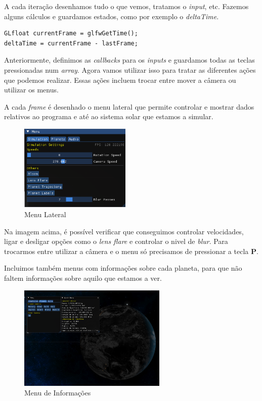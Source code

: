\noindent
A cada iteração desenhamos tudo o que vemos, tratamos o \textit{input}, etc. Fazemos alguns cálculos e guardamos estados, como por exemplo o \textit{deltaTime}.

\begin{lstlisting}[style=Cpp, caption=\textit{DeltaTime}]
GLfloat currentFrame = glfwGetTime();
deltaTime = currentFrame - lastFrame;
\end{lstlisting}

\noindent
Anteriormente, definimos as \textit{callbacks} para os \textit{inputs} e guardamos todas as teclas pressionadas num \textit{array}. Agora vamos utilizar isso para tratar as diferentes ações que podemos realizar.
Essas ações incluem trocar entre mover a câmera ou utilizar os menus.

\noindent
A cada \textit{frame} é desenhado o menu lateral que permite controlar e mostrar dados relativos ao programa e até ao sistema solar que estamos a simular.

\begin{figure}[h]
\centering
\includegraphics[width=150pt]{menu.png}
\caption{Menu Lateral}
\end{figure}

\noindent
Na imagem acima, é possível verificar que conseguimos controlar velocidades, ligar e desligar opções como o \textit{lens flare} e controlar o nivel de \textit{blur}.
Para trocarmos entre utilizar a câmera e o menu só precisamos de pressionar a tecla \textbf{P}.

\noindent
Incluimos também menus com informações sobre cada planeta, para que não faltem informações sobre aquilo que estamos a ver.

\enlargethispage{1in}
\thispagestyle{empty}
\begin{figure}[h]
    \centering
    \includegraphics[width=200pt]{earth_menu.png}
    \caption{Menu de Informações}
\end{figure}

